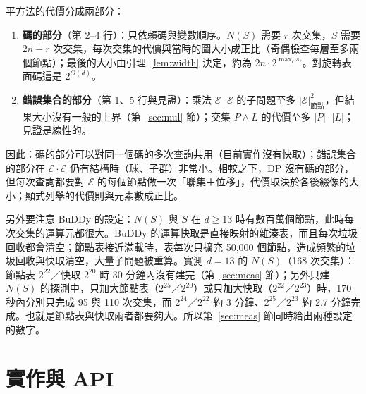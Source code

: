 \documentclass[a4paper,11pt,fontset=none]{ctexart}
\newcommand{\E}{\mathcal{E}}
\theoremstyle{definition}
\begin{document}
平方法的代價分成兩部分：
\begin{enumerate}[leftmargin=2em]
\item \textbf{碼的部分}（第 2--4 行）：只依賴碼與變數順序。$N(S)$ 需要 $r$ 次交集，$S$ 需要 $2n-r$ 次交集，每次交集的代價與當時的圖大小成正比（奇偶檢查每層至多兩個節點）；最後的大小由引理~\ref{lem:width} 決定，約為 $2n\cdot2^{\max_\ell s_\ell}$。對旋轉表面碼這是 $2^{\Theta(d)}$。
\item \textbf{錯誤集合的部分}（第 1、5 行與見證）：乘法 $\E\cdot\E$ 的子問題至多 $\lvert\E\rvert_{\text{節點}}^2$，但結果大小沒有一般的上界（第~\ref{sec:mul} 節）；交集 $P\wedge L$ 的代價至多 $\lvert P\rvert\cdot\lvert L\rvert$；見證是線性的。
\end{enumerate}
因此：碼的部分可以對同一個碼的多次查詢共用（目前實作沒有快取）；錯誤集合的部分在 $\E\cdot\E$ 仍有結構時（球、子群）非常小。相較之下，DP 沒有碼的部分，但每次查詢都要對 $\E$ 的每個節點做一次「聯集＋位移」，代價取決於各後綴像的大小；顯式列舉的代價則與元素數成正比。

另外要注意 BuDDy 的設定：$N(S)$ 與 $S$ 在 $d\ge13$ 時有數百萬個節點，此時每次交集的運算元都很大。BuDDy 的運算快取是直接映射的雜湊表，而且每次垃圾回收都會清空；節點表接近滿載時，表每次只擴充 50,000 個節點，造成頻繁的垃圾回收與快取清空，大量子問題被重算。實測 $d{=}13$ 的 $N(S)$（168 次交集）：節點表 $2^{22}$／快取 $2^{20}$ 時 30 分鐘內沒有建完（第~\ref{sec:meas} 節）；另外只建 $N(S)$ 的探測中，只加大節點表（$2^{25}$／$2^{20}$）或只加大快取（$2^{22}$／$2^{23}$）時，170 秒內分別只完成 95 與 110 次交集，而 $2^{24}$／$2^{22}$ 約 3 分鐘、$2^{25}$／$2^{23}$ 約 2.7 分鐘完成。也就是節點表與快取兩者都要夠大。所以第~\ref{sec:meas} 節同時給出兩種設定的數字。

\section{實作與 API}
\end{document}
